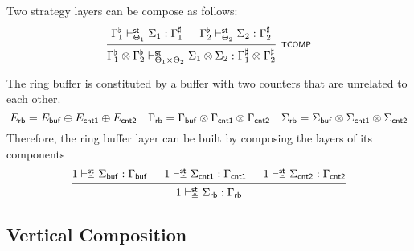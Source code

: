 \documentclass[acmsmall,review,anonymous]{acmart}\settopmatter{printfolios=true,printccs=false,printacmref=false}
\begin{document}
\begin{theorem}
  Two strategy layers can be compose as follows:
  \[
    \begin{prooftree}
      \hypo{\Gamma_1^\flat \vdash^\kw{st}_{\Theta_1} \Sigma_1 : \Gamma_1^\sharp}
      \hypo{\Gamma_2^\flat \vdash^\kw{st}_{\Theta_2} \Sigma_2 : \Gamma_2^\sharp}
      \infer2[\scriptsize\kw{TCOMP}]
      {\Gamma_1^\flat \otimes \Gamma_2^\flat
        \vdash^\kw{st}_{\Theta_1 \times \Theta_2}
        \Sigma_1 \otimes \Sigma_2 : \Gamma_1^\sharp \otimes \Gamma_2^\sharp}
    \end{prooftree}
  \]
\end{theorem}

The ring buffer is constituted by
a buffer with two counters
that are unrelated to each other.
\[
  E_{ \mathsf{rb} } = E_{ \mathsf{buf} } \oplus E_{ \mathsf{cnt1} } \oplus E_{ \mathsf{cnt2} }\quad
  \Gamma_{ \mathsf{rb} } = \Gamma_{ \mathsf{buf} } \otimes \Gamma_{ \mathsf{cnt1} } \otimes \Gamma_{ \mathsf{cnt2} }\quad
  \Sigma_{ \mathsf{rb} } = \Sigma_{ \mathsf{buf} } \otimes \Sigma_{ \mathsf{cnt1} } \otimes \Sigma_{ \mathsf{cnt2} }
\]
Therefore, the ring buffer layer
can be built by composing the layers
of its components
\[
  \begin{prooftree}
    \hypo{1 \vdash^\kw{st}_\kw{\tilde{=}} \Sigma_\kw{buf} : \Gamma_\kw{buf}}
    \hypo{1 \vdash^\kw{st}_\kw{\tilde{=}} \Sigma_\kw{cnt1} : \Gamma_\kw{cnt1}}
    \hypo{1 \vdash^\kw{st}_\kw{\tilde{=}} \Sigma_\kw{cnt2} : \Gamma_\kw{cnt2}}
    \infer3{1 \vdash^\kw{st}_\kw{\tilde{=}} \Sigma_\kw{rb} : \Gamma_\kw{rb}}
  \end{prooftree}
\]


\subsection{Vertical Composition} %
\label{sec:stcal:vcomp}


\end{document}
